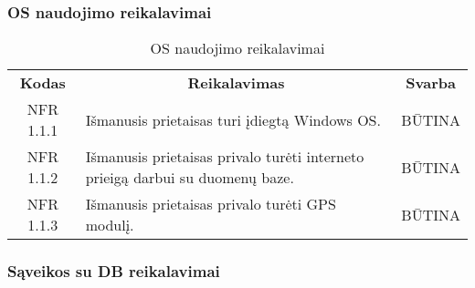 \documentclass{VUMIFPSkursinis}
\begin{document}
\subsubsection{OS naudojimo reikalavimai}

\begin{center}
	\begin{table}[H]
	\begin{tabular}{|p{2cm}|p{}|p{}|}
	\hline
	    \rowcolor{lightgray}
		\multicolumn{3}{|c|}{Apsaugos reikalavimai}\\
		
	\hline
		\multicolumn{1}{|c|}{{\bfseries Kodas}}&
		\multicolumn{1}{|c|}{{\bfseries Reikalavimas}}&
		\multicolumn{1}{|c|}{{\bfseries Svarba}}\\
	\hline 	
		\multicolumn{1}{|c|}{NFR 1.1.1}&
		{Išmanusis prietaisas turi įdiegtą Windows OS.}&
		\multicolumn{1}{|c|}{BŪTINA}\\	
	
	\hline 	
		\multicolumn{1}{|c|}{NFR 1.1.2}&
		{Išmanusis prietaisas privalo turėti interneto prieigą darbui su duomenų baze.}&
		\multicolumn{1}{|c|}{BŪTINA}\\	
	
	\hline 	
		\multicolumn{1}{|c|}{NFR 1.1.3}&
		{Išmanusis prietaisas privalo turėti GPS modulį.}&
		\multicolumn{1}{|c|}{BŪTINA}\\	
	
	\hline 	 	
	\end{tabular}
	\caption{OS naudojimo reikalavimai}
	\label{table:OSnaudojimoreikalavimai}
	\end{table}

\end{center}

\subsubsection{Sąveikos su DB reikalavimai}
\end{document}
